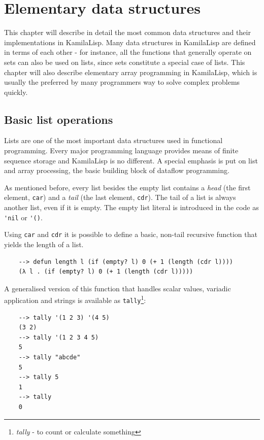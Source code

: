 
\chapter{Elementary data structures}

This chapter will describe in detail the most common data structures and their implementations in KamilaLisp. Many data structures in KamilaLisp are defined in terms of each other - for instance, all the functions that generally operate on sets can also be used on lists, since sets constitute a special case of lists. This chapter will also describe elementary array programming in KamilaLisp, which is usually the preferred by many programmers way to solve complex problems quickly.

\section{Basic list operations}

Lists are one of the most important data structures used in functional programming. Every major programming language provides means of finite sequence storage and KamilaLisp is no different. A special emphasis is put on list and array processing, the basic building block of dataflow programming.

As mentioned before, every list besides the empty list contains a \textit{head} (the first element, \verb|car|) and a \textit{tail} (the last element, \verb|cdr|). The tail of a list is always another list, even if it is empty. The empty list literal is introduced in the code as \verb|'nil| or \verb|'()|. 

Using \verb|car| and \verb|cdr| it is possible to define a basic, non-tail recursive function that yields the length of a list.

\begin{Verbatim}
    --> defun length l (if (empty? l) 0 (+ 1 (length (cdr l))))
    (λ l . (if (empty? l) 0 (+ 1 (length (cdr l)))))
\end{Verbatim}

A generalised version of this function that handles scalar values, variadic application and strings is available as \verb|tally|\footnote{\textit{tally} - to count or calculate something}:

\begin{Verbatim}
    --> tally '(1 2 3) '(4 5)
    (3 2)
    --> tally '(1 2 3 4 5)
    5
    --> tally "abcde"
    5
    --> tally 5
    1
    --> tally
    0
\end{Verbatim}

